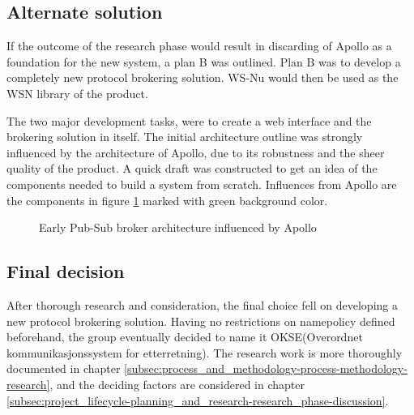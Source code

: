 \subsection{Alternate solution}
\label{subsec:prestudies-alternate_solution}

If the outcome of the research phase would result in discarding of Apollo as a foundation for the new system, a plan B was outlined. Plan B was to develop a completely new protocol brokering solution. WS-Nu would then be used as the WSN library of the product. 

The two major development tasks, were to create a web interface and the brokering solution in itself. The initial architecture outline was strongly influenced by the architecture of Apollo, due to its robustness and the sheer quality of the product. A quick draft was constructed to get an idea of the components needed to build a system from scratch. Influences from Apollo are the components in figure \ref{fig:arch_proposal} marked with green background color.

\begin{center}
  \begin{figure}[ht!]
    \caption{Early Pub-Sub broker architecture influenced by Apollo}
    \label{fig:arch_proposal}
  \end{figure}
\end{center}

\subsection{Final decision}

After thorough research and consideration, the final choice fell on developing a new protocol brokering solution. Having no restrictions on namepolicy defined beforehand, the group eventually decided to name it OKSE(Overordnet kommunikasjonssystem for etterretning). The research work is more thoroughly documented in chapter \ref{subsec:process_and_methodology-process-methodology-research}, and the deciding factors are considered in chapter \ref{subsec:project_lifecycle-planning_and_research-research_phase-discussion}.

